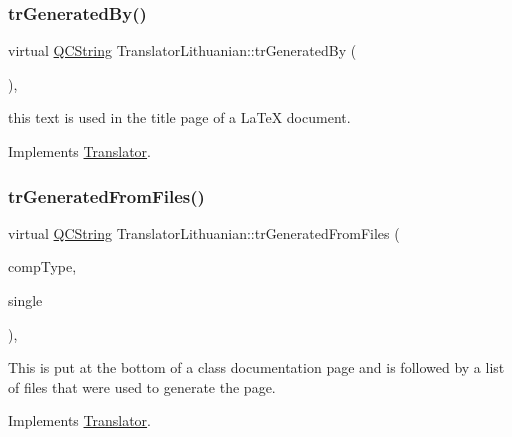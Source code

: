 \mbox{\label{class_translator_lithuanian_a13dd7f0df32e3dfeb7bec4f811cf24d8}} 
\subsubsection{\texorpdfstring{trGeneratedBy()}{trGeneratedBy()}}
{\footnotesize\ttfamily virtual \mbox{\hyperlink{class_q_c_string}{Q\+C\+String}} Translator\+Lithuanian\+::tr\+Generated\+By (\begin{DoxyParamCaption}{ }\end{DoxyParamCaption})\hspace{0.3cm}{\ttfamily [inline]}, {\ttfamily [virtual]}}

this text is used in the title page of a La\+TeX document. 

Implements \mbox{\hyperlink{class_translator}{Translator}}.

\mbox{\label{class_translator_lithuanian_a724d28c1e884cfb86b1ec07594096538}} 
\subsubsection{\texorpdfstring{trGeneratedFromFiles()}{trGeneratedFromFiles()}}
{\footnotesize\ttfamily virtual \mbox{\hyperlink{class_q_c_string}{Q\+C\+String}} Translator\+Lithuanian\+::tr\+Generated\+From\+Files (\begin{DoxyParamCaption}\item[{\mbox{\hyperlink{class_class_def_ae70cf86d35fe954a94c566fbcfc87939}{Class\+Def\+::\+Compound\+Type}}}]{comp\+Type,  }\item[{bool}]{single }\end{DoxyParamCaption})\hspace{0.3cm}{\ttfamily [inline]}, {\ttfamily [virtual]}}

This is put at the bottom of a class documentation page and is followed by a list of files that were used to generate the page. 

Implements \mbox{\hyperlink{class_translator}{Translator}}.

